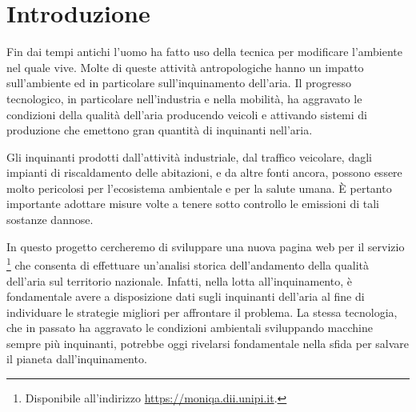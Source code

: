 \chapter{Introduzione}

Fin dai tempi antichi l'uomo ha fatto uso della tecnica per modificare
l'ambiente nel quale vive. Molte di queste attività antropologiche hanno un
impatto sull'ambiente ed in particolare sull'inquinamento dell'aria. Il
progresso tecnologico, in particolare nell'industria e nella mobilità, ha
aggravato le condizioni della qualità dell'aria producendo veicoli e attivando
sistemi di produzione che emettono gran quantità di inquinanti nell'aria.

Gli inquinanti prodotti dall'attività industriale, dal traffico veicolare, dagli
impianti di riscaldamento delle abitazioni, e da altre fonti ancora, possono
essere molto pericolosi per l'ecosistema ambientale e per la salute umana. È
pertanto importante adottare misure volte a tenere sotto controllo le emissioni
di tali sostanze dannose.

In questo progetto cercheremo di sviluppare una nuova pagina web per il servizio
\MonIQA\footnote{Disponibile all'indirizzo \url{https://moniqa.dii.unipi.it}.}
che consenta di effettuare un'analisi storica dell'andamento della qualità
dell'aria sul territorio nazionale.  Infatti, nella lotta all'inquinamento, è
fondamentale avere a disposizione dati sugli inquinanti dell'aria al fine di
individuare le strategie migliori per affrontare il problema. La stessa
tecnologia, che in passato ha aggravato le condizioni ambientali sviluppando
macchine sempre più inquinanti, potrebbe oggi rivelarsi fondamentale nella sfida
per salvare il pianeta dall'inquinamento.



